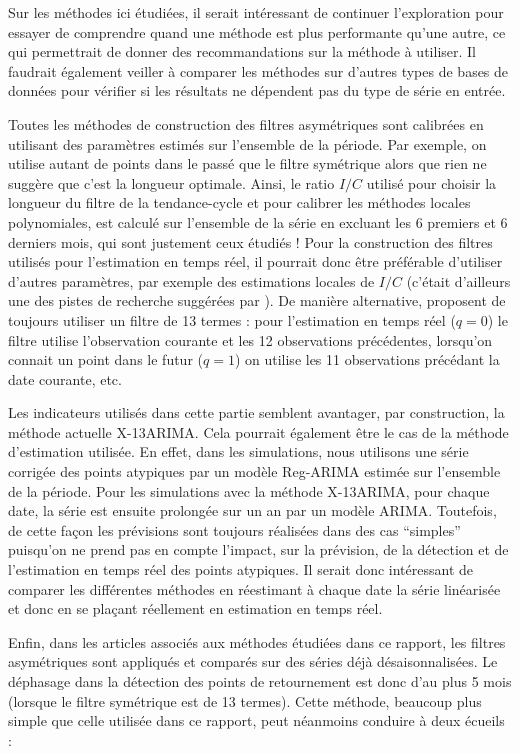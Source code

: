 \documentclass[
  11pt,
  french,
  a4paper]{article}
\newcommand\1{\mathds{1}}
\begin{document}
Sur les méthodes ici étudiées, il serait intéressant de continuer l'exploration pour essayer de comprendre quand une méthode est plus performante qu'une autre, ce qui permettrait de donner des recommandations sur la méthode à utiliser.
Il faudrait également veiller à comparer les méthodes sur d'autres types de bases de données pour vérifier si les résultats ne dépendent pas du type de série en entrée.

Toutes les méthodes de construction des filtres asymétriques sont calibrées en utilisant des paramètres estimés sur l'ensemble de la période.
Par exemple, on utilise autant de points dans le passé que le filtre symétrique alors que rien ne suggère que c'est la longueur optimale.
Ainsi, le ratio \(I/C\) utilisé pour choisir la longueur du filtre de la tendance-cycle et pour calibrer les méthodes locales polynomiales, est calculé sur l'ensemble de la série en excluant les 6 premiers et 6 derniers mois, qui sont justement ceux étudiés !
Pour la construction des filtres utilisés pour l'estimation en temps réel, il pourrait donc être préférable d'utiliser d'autres paramètres, par exemple des estimations locales de \(I/C\) (c'était d'ailleurs une des pistes de recherche suggérées par \textcite{GrayThomson1996}).
De manière alternative, \textcite{vasyechko2014new} proposent de toujours utiliser un filtre de 13 termes : pour l'estimation en temps réel (\(q=0\)) le filtre utilise l'observation courante et les 12 observations précédentes, lorsqu'on connait un point dans le futur (\(q=1\)) on utilise les 11 observations précédant la date courante, etc.

Les indicateurs utilisés dans cette partie semblent avantager, par construction, la méthode actuelle X-13ARIMA.
Cela pourrait également être le cas de la méthode d'estimation utilisée.
En effet, dans les simulations, nous utilisons une série corrigée des points atypiques par un modèle Reg-ARIMA estimée sur l'ensemble de la période.
Pour les simulations avec la méthode X-13ARIMA, pour chaque date, la série est ensuite prolongée sur un an par un modèle ARIMA.
Toutefois, de cette façon les prévisions sont toujours réalisées dans des cas ``simples'' puisqu'on ne prend pas en compte l'impact, sur la prévision, de la détection et de l'estimation en temps réel des points atypiques.
Il serait donc intéressant de comparer les différentes méthodes en réestimant à chaque date la série linéarisée et donc en se plaçant réellement en estimation en temps réel.

Enfin, dans les articles associés aux méthodes étudiées dans ce rapport, les filtres asymétriques sont appliqués et comparés sur des séries déjà désaisonnalisées.
Le déphasage dans la détection des points de retournement est donc d'au plus 5 mois (lorsque le filtre symétrique est de 13 termes).
Cette méthode, beaucoup plus simple que celle utilisée dans ce rapport, peut néanmoins conduire à deux écueils :
\end{document}
